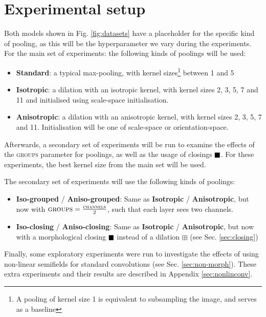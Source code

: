 \documentclass[a4paper, 12pt]{report}
\DeclareMathOperator{\boxclose}{\vcenter{\hbox{$\blacksquare$}}}
\begin{document}
\newpage
\section{Experimental setup}
\label{sec:setup}
Both models shown in Fig. \ref{fig:datasets} have a placeholder for the specific kind of pooling, as this will be the hyperparameter we vary during the experiments.
For the main set of experiments: the following kinds of poolings will be used:
\begin{itemize}
\vspace{-0.1cm}
\setlength{\itemsep}{0pt}
	\item \textbf{Standard}: a typical max-pooling, with kernel sizes\footnote{A pooling of kernel size 1 is equivalent to subsampling the image, and serves as a baseline} between 1 and 5
	\item \textbf{Isotropic}: a dilation with an isotropic kernel, with kernel sizes 2, 3, 5, 7 and 11 and initialised using scale-space initialisation.
	\item \textbf{Anisotropic}: a dilation with an anisotropic kernel, with kernel sizes 2, 3, 5, 7 and 11. Initialisation will be one of scale-space or orientation-space.
\end{itemize}
\vspace{-0.1cm}
Afterwards, a secondary set of experiments will be run to examine the effects of the \textsc{groups} parameter for poolings, as well as the usage of closings $\boxclose$. For these experiments, the best kernel size from the main set will be used.

The secondary set of experiments will use the following kinds of poolings:
\begin{itemize}
\vspace{-0.1cm}
\setlength{\itemsep}{0pt}
	\item \textbf{Iso-grouped} / \textbf{Aniso-grouped}: Same as \textbf{Isotropic} / \textbf{Anisotropic}, but now with $\textsc{groups}=\frac{\textsc{channels}}{2}$, such that each layer sees two channels.
	\item \textbf{Iso-closing} / \textbf{Aniso-closing}: Same as \textbf{Isotropic} / \textbf{Anisotropic}, but now with a morphological closing $\boxclose$ instead of a dilation $\boxplus$ (see Sec. \ref{sec:closing})
\end{itemize}
\vspace{-0.1cm}
Finally, some exploratory experiments were run to investigate the effects of using non-linear semifields for standard convolutions (see Sec. \ref{sec:non-morph}). These extra experiments and their results are described in Appendix \ref{sec:nonlinconv}.
\end{document}
